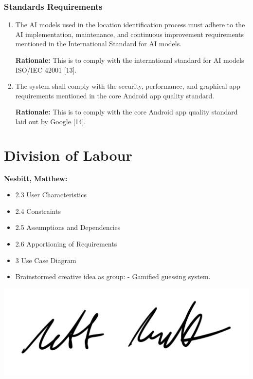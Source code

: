 \documentclass[]{article}
\begin{document}
\subsubsection{Standards Requirements}
\label{ssub:standards_requirements}
\begin{enumerate}[{LR-STD}1. ]
	\item The AI models used in the location identification process must adhere to the AI implementation, maintenance, and continuous improvement requirements mentioned in the International Standard for AI models.

    {\bf Rationale:} This is to comply with the international standard for AI models ISO/IEC 42001 [13].
    \item The system shall comply with the security, performance, and graphical app requirements mentioned in the core Android app quality standard. 

    {\bf Rationale:} This is to comply with the core Android app quality standard laid out by Google [14].
\end{enumerate}



\appendix
\section{Division of Labour}
\label{sec:division_of_labour}
\textbf{Nesbitt, Matthew:}
\begin{itemize}
	\item 2.3 User Characteristics
	\item 2.4 Constraints
	\item 2.5 Assumptions and Dependencies
	\item 2.6 Apportioning of Requirements
	\item 3 Use Case Diagram
	\item Brainstormed creative idea as group:
		\subitem - Gamified guessing system.
\end{itemize}
\includegraphics[scale=0.15]{mattsignature.jpg}
\end{document}
